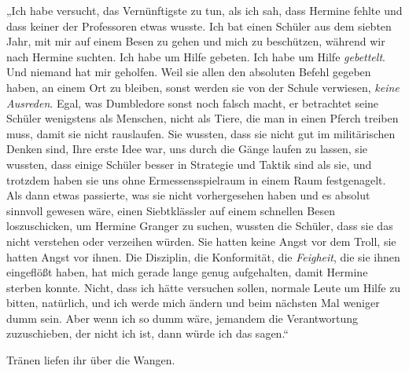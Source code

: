 „Ich habe versucht, das Vernünftigste zu tun, als ich sah, dass Hermine fehlte und dass keiner der Professoren etwas wusste. Ich bat einen Schüler aus dem siebten Jahr, mit mir auf einem Besen zu gehen und mich zu beschützen, während wir nach Hermine suchten. Ich habe um Hilfe gebeten. Ich habe um Hilfe \emph{gebettelt}. Und niemand hat mir geholfen. Weil sie allen den absoluten Befehl gegeben haben, an einem Ort zu bleiben, sonst werden sie von der Schule verwiesen, \emph{keine Ausreden}. Egal, was Dumbledore sonst noch falsch macht, er betrachtet seine Schüler wenigstens als Menschen, nicht als Tiere, die man in einen Pferch treiben muss, damit sie nicht rauslaufen. Sie wussten, dass sie nicht gut im militärischen Denken sind, Ihre erste Idee war, uns durch die Gänge laufen zu lassen, sie wussten, dass einige Schüler besser in Strategie und Taktik sind als sie, und trotzdem haben sie uns ohne Ermessensspielraum in einem Raum festgenagelt. Als dann etwas passierte, was sie nicht vorhergesehen haben und es absolut sinnvoll gewesen wäre, einen Siebtklässler auf einem schnellen Besen loszuschicken, um Hermine Granger zu suchen, wussten die Schüler, dass sie das nicht verstehen oder verzeihen würden. Sie hatten keine Angst vor dem Troll, sie hatten Angst vor ihnen. Die Disziplin, die Konformität, die \emph{Feigheit}, die sie ihnen eingeflößt haben, hat mich gerade lange genug aufgehalten, damit Hermine sterben konnte. Nicht, dass ich hätte versuchen sollen, normale Leute um Hilfe zu bitten, natürlich, und ich werde mich ändern und beim nächsten Mal weniger dumm sein. Aber wenn ich so dumm wäre, jemandem die Verantwortung zuzuschieben, der nicht ich ist, dann würde ich das sagen.“

Tränen liefen ihr über die Wangen.

